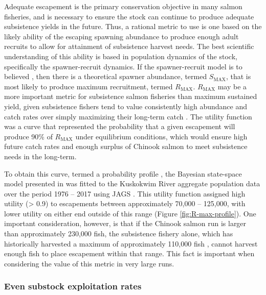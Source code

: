 \documentclass[12pt,]{book}
\theoremstyle{definition}
\theoremstyle{definition}
\theoremstyle{definition}
\theoremstyle{remark}
\begin{document}
\noindent
Adequate escapement is the primary conservation objective in many salmon
fisheries, and is necessary to ensure the stock can continue to produce
adequate subsistence yields in the future. Thus, a rational metric to
use is one based on the likely ability of the escaping spawning
abundance to produce enough adult recruits to allow for attainment of
subsistence harvest needs. The best scientific understanding of this
ability is based in population dynamics of the stock, specifically the
spawner-recruit dynamics. If the \citet{ricker-1954} spawner-recruit
model is to believed \citep[as is often done in salmon population
analyses,][see Chapter \ref{ch4}, this dissertation as
well]{fleischman-etal-2013}, then there is a theoretical spawner
abundance, termed \(S_{\text{MAX}}\), that is most likely to produce
maximum recruitment, termed \(R_{\text{MAX}}\). \(R_{\text{MAX}}\) may
be a more important metric for subsistence salmon fisheries than maximum
sustained yield, given subsistence fishers tend to value consistently
high abundance and catch rates over simply maximizing their long-term
catch \citep{hamazaki-etal-2012}. The utility function was a curve that
represented the probability that a given escapement will produce 90\% of
\(R_{\text{MAX}}\) under equilibrium conditions, which would ensure high
future catch rates and enough surplus of Chinook salmon to meet
subsistence needs in the long-term.

To obtain this curve, termed a probability profile
\citep{fleischman-etal-2013}, the Bayesian state-space model presented
in \citet{hamazaki-etal-2012} was fitted to the Kuskokwim River
aggregate population data over the period 1976 -- 2017 using JAGS
\citep{plummer-2017}. This utility function assigned high utility
(\textgreater{} 0.9) to escapements between approximately 70,000 --
125,000, with lower utility on either end outside of this range (Figure
\ref{fig:R-max-profile}). One important consideration, however, is that
if the Chinook salmon run is larger than approximately 230,000 fish, the
subsistence fishery alone, which has historically harvested a maximum of
approximately 110,000 fish \citep{hamazaki-2011}, cannot harvest enough
fish to place escapement within that range. This fact is important when
considering the value of this metric in very large runs.

\subsubsection{Even substock exploitation rates}\label{U-metric}
\end{document}
